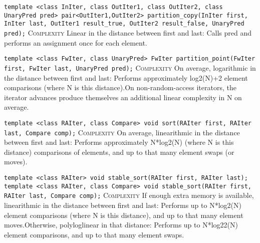 \noindent{}\hspace*{0.25em}\lstinline[basicstyle=\ttfamily\color{corange}]{template <class InIter, class OutIter1, class OutIter2, class UnaryPred pred> pair<OutIter1,OutIter2> partition_copy(InIter first, InIter last, OutIter1 result_true, OutIter2 result_false, UnaryPred pred);} \textsc{Complexity} Linear in the distance between first and last: Calls pred and performs an assignment once for each element.\\\vspace{-0.6em}

\noindent{}\hspace*{0.25em}\lstinline[basicstyle=\ttfamily\color{corange}]{template <class FwIter, class UnaryPred> FwIter partition_point(FwIter first, FwIter last, UnaryPred pred);} \textsc{Complexity} On average, logarithmic in the distance between first and last: Performs approximately log2(N)+2 element comparisons (where N is this distance).On non-random-access iterators, the iterator advances produce themselves an additional linear complexity in N on average.\\\vspace{-0.6em}

\noindent{}\hspace*{0.25em}\lstinline[basicstyle=\ttfamily\color{cred}]{template <class RAIter, class Compare> void sort(RAIter first, RAIter last, Compare comp);} \textsc{Complexity} On average, linearithmic in the distance between first and last: Performs approximately N*log2(N) (where N is this distance) comparisons of elements, and up to that many element swaps (or moves).\\\vspace{-0.6em}

\noindent{}\hspace*{0.25em}\lstinline[basicstyle=\ttfamily\color{cred}]{template <class RAIter> void stable_sort(RAIter first, RAIter last); template <class RAIter, class Compare> void stable_sort(RAIter first, RAIter last, Compare comp);} \textsc{Complexity} If enough extra memory is available, linearithmic in the distance between first and last: Performs up to N*log2(N) element comparisons (where N is this distance), and up to that many element moves.Otherwise, polyloglinear in that distance: Performs up to N*log22(N) element comparisons, and up to that many element swaps.\\\vspace{-0.6em}

